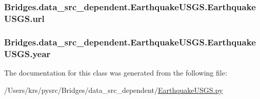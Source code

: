 \subsubsection[{url}]{\setlength{\rightskip}{0pt plus 5cm}Bridges.\+data\+\_\+src\+\_\+dependent.\+Earthquake\+U\+S\+G\+S.\+Earthquake\+U\+S\+G\+S.\+url}\label{class_bridges_1_1data__src__dependent_1_1_earthquake_u_s_g_s_1_1_earthquake_u_s_g_s_aeb5b38c229868d11ea436fc76398ddf5}
\hypertarget{class_bridges_1_1data__src__dependent_1_1_earthquake_u_s_g_s_1_1_earthquake_u_s_g_s_af11c1d01b1b8ce2a4f7c72190db9b853}{}
\subsubsection[{year}]{\setlength{\rightskip}{0pt plus 5cm}Bridges.\+data\+\_\+src\+\_\+dependent.\+Earthquake\+U\+S\+G\+S.\+Earthquake\+U\+S\+G\+S.\+year}\label{class_bridges_1_1data__src__dependent_1_1_earthquake_u_s_g_s_1_1_earthquake_u_s_g_s_af11c1d01b1b8ce2a4f7c72190db9b853}


The documentation for this class was generated from the following file\+:\begin{DoxyCompactItemize}
\item 
/\+Users/krs/pysrc/\+Bridges/data\+\_\+src\+\_\+dependent/\hyperlink{_earthquake_u_s_g_s_8py}{Earthquake\+U\+S\+G\+S.\+py}\end{DoxyCompactItemize}
